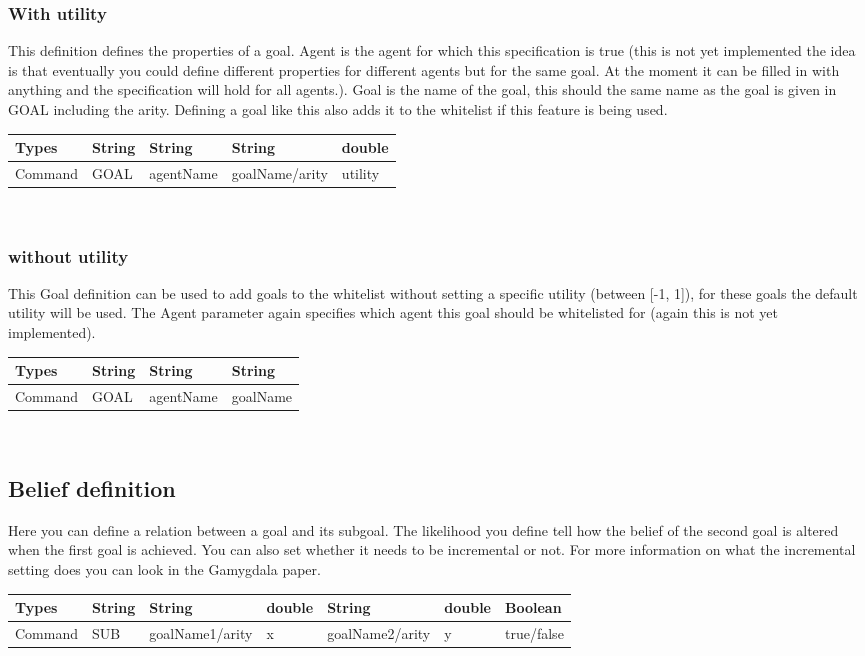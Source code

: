 \documentclass{scrartcl}
\begin{document}
\subsubsection{With utility}
This definition defines the properties of a goal. Agent is the agent for which this specification is true (this is not yet implemented the idea is that eventually you could define different properties for different agents but for the same goal. At the moment it can be filled in with anything and the specification will hold for all agents.). Goal is the name of the goal, this should the same name as the goal is given in GOAL including the arity. Defining a goal like this also adds it to the whitelist if this feature is being used.\\
\begin{tabular}{|l|l|l|l|l|}
	\hline  Types& String & String & String & double \\ 
	\hline  Command & GOAL & agentName & goalName/arity & utility  \\ 
	\hline 
\end{tabular} 
\\
\subsubsection{without utility}
This Goal definition can be used to add goals to the whitelist without setting a specific utility (between [-1, 1]), for these goals the default utility will be used. The Agent parameter again specifies which agent this goal should be whitelisted for (again this is not yet implemented).\\
\begin{tabular}{|l|l|l|l|}
	\hline  Types& String & String & String \\ 
	\hline  Command & GOAL & agentName & goalName\\ 
	\hline 
\end{tabular}
\\


\subsection{Belief definition}
Here you can define a relation between a goal and its subgoal. The likelihood you define tell how the belief of the second goal is altered when the first goal is achieved. You can also set whether it needs to be incremental or not. For more information on what the incremental setting does you can look in the Gamygdala paper.\\
\begin{tabular}{|l|l|l|l|l|l|l|}
	\hline  Types& String & String & double & String & double & Boolean \\ 
	\hline  Command & SUB & goalName1/arity & x & goalName2/arity & y & true/false\\ 
	\hline 
\end{tabular} 
\\
\end{document}
